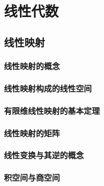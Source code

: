 \documentclass{tufte-book}
\begin{document}





\part{线性代数}

\chapter{线性映射}
\section{线性映射的概念}
\section{线性映射构成的线性空间}
\section{有限维线性映射的基本定理}
\section{线性映射的矩阵}
\section{线性变换与其逆的概念}
\section{积空间与商空间}
\end{document}
